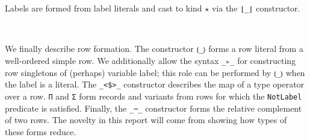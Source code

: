\documentclass[authoryear, acmsmall, screen, review, nonacm]{acmart}
\begin{document}
\Ni Labels are formed from label literals and cast to kind $\star$ via the \verb!⌊_⌋! constructor.

\begin{code}%
%
\>[2]\AgdaSpace{}%
\AgdaSymbol{:}\AgdaSpace{}%
\AgdaSymbol{(}\AgdaSpace{}%
\AgdaSymbol{:}\AgdaSpace{}%
\AgdaSymbol{)}\AgdaSpace{}%
\AgdaSpace{}%
\AgdaSpace{}%
\AgdaSpace{}%
\<%
\\
%
\>[2]\AgdaSpace{}%
\AgdaSymbol{:}\AgdaSpace{}%
\AgdaSymbol{(}\AgdaSpace{}%
\AgdaSymbol{:}\AgdaSpace{}%
\AgdaSpace{}%
\AgdaSpace{}%
\AgdaSymbol{)}\AgdaSpace{}%
\AgdaSpace{}%
\AgdaSpace{}%
\AgdaSpace{}%
\<%
\end{code}

\Ni We finally describe row formation. The constructor \verb!⦅_⦆! forms a row literal from a well-ordered simple row. We additionally allow the syntax \verb!_▹_! for constructing row singletons of (perhaps) variable label; this role can be performed by \verb!⦅_⦆! when the label is a literal. The \verb!_<$>_! constructor describes the map of a type operator over a row. \verb!Π! and \verb!Σ! form records and variants from rows for which the \verb!NotLabel! predicate is satisfied. Finally, the \verb!_─_! constructor forms the relative complement of two rows. The novelty in this report will come from showing how types of these forms reduce.
\end{document}
